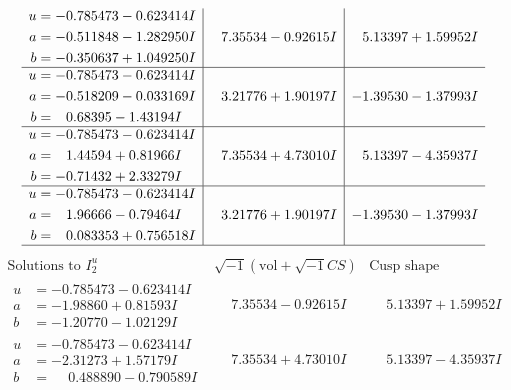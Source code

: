 \documentclass[1p]{elsarticle_modified}
\theoremstyle{definition}
\newcommand{\I}{\sqrt{-1}}
\begin{document}
$$\begin{array}{c|c|c}
\begin{aligned}
u &= -0.785473 - 0.623414 I \\
a &= -0.511848 - 1.282950 I \\
b &= -0.350637 + 1.049250 I\end{aligned}
 & \phantom{-}7.35534 - 0.92615 I & \phantom{-}5.13397 + 1.59952 I \\ \hline\begin{aligned}
u &= -0.785473 - 0.623414 I \\
a &= -0.518209 - 0.033169 I \\
b &= \phantom{-}0.68395 - 1.43194 I\end{aligned}
 & \phantom{-}3.21776 + 1.90197 I & -1.39530 - 1.37993 I \\ \hline\begin{aligned}
u &= -0.785473 - 0.623414 I \\
a &= \phantom{-}1.44594 + 0.81966 I \\
b &= -0.71432 + 2.33279 I\end{aligned}
 & \phantom{-}7.35534 + 4.73010 I & \phantom{-}5.13397 - 4.35937 I \\ \hline\begin{aligned}
u &= -0.785473 - 0.623414 I \\
a &= \phantom{-}1.96666 - 0.79464 I \\
b &= \phantom{-}0.083353 + 0.756518 I\end{aligned}
 & \phantom{-}3.21776 + 1.90197 I & -1.39530 - 1.37993 I\\
 \hline 
 \end{array}$$\newpage$$\begin{array}{c|c|c}  
\text{Solutions to }I^u_{2}& \I (\text{vol} + \sqrt{-1}CS) & \text{Cusp shape}\\
 \hline 
\begin{aligned}
u &= -0.785473 - 0.623414 I \\
a &= -1.98860 + 0.81593 I \\
b &= -1.20770 - 1.02129 I\end{aligned}
 & \phantom{-}7.35534 - 0.92615 I & \phantom{-}5.13397 + 1.59952 I \\ \hline\begin{aligned}
u &= -0.785473 - 0.623414 I \\
a &= -2.31273 + 1.57179 I \\
b &= \phantom{-}0.488890 - 0.790589 I\end{aligned}
 & \phantom{-}7.35534 + 4.73010 I & \phantom{-}5.13397 - 4.35937 I \\ \hline\begin{aligned}

\end{aligned}
\end{array}$$
\end{document}
